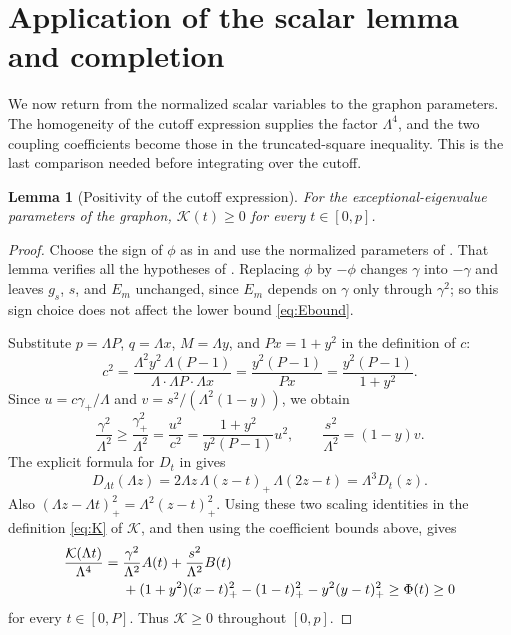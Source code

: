\documentclass[11pt]{article}
\numberwithin{equation}{section}
\newtheorem{lemma}[theorem]{Lemma}
\begin{document}
\section{Application of the scalar lemma and completion}\label{sec:completion}
We now return from the normalized scalar variables to the graphon
parameters. The homogeneity of the cutoff expression supplies the
factor $\Lambda^4$, and the two coupling coefficients become those
in the truncated-square inequality. This is the last comparison
needed before integrating over the cutoff.
\begin{lemma}[Positivity of the cutoff expression]\label{lem:cutoff-positive}
For the exceptional-eigenvalue parameters of the graphon,
$\mathcal K(t)\ge0$ for every $t\in[0,p]$.
\end{lemma}
\begin{proof}
Choose the sign of $\phi$ as in  and use
the normalized parameters of .
That lemma verifies all the hypotheses of .
Replacing $\phi$ by $-\phi$ changes $\gamma$ into $-\gamma$ and
leaves $g_s$, $s$, and $E_m$ unchanged, since $E_m$ depends on
$\gamma$ only through $\gamma^2$; so this sign choice does not
affect the lower bound \eqref{eq:Ebound}.

Substitute $p=\Lambda P$, $q=\Lambda x$, $M=\Lambda y$,
and $Px=1+y^2$ in the definition of $c$:
\[
 c^2=\frac{\Lambda^2y^2\,\Lambda(P-1)}
              {\Lambda\cdot\Lambda P\cdot\Lambda x}
     =\frac{y^2(P-1)}{Px}
     =\frac{y^2(P-1)}{1+y^2}.
\]
Since $u=c\gamma_+/\Lambda$ and
$v=s^2/(\Lambda^2(1-y))$, we obtain
\[
 \frac{\gamma^2}{\Lambda^2}\ge
 \frac{\gamma_+^2}{\Lambda^2}
 =\frac{u^2}{c^2}
 =\frac{1+y^2}{y^2(P-1)}u^2,\qquad
 \frac{s^2}{\Lambda^2}=(1-y)v.
\]
The explicit formula for $D_t$ in  gives
\[
 D_{\Lambda t}(\Lambda z)
  =2\Lambda z\,\Lambda(z-t)_+\,\Lambda(2z-t)
  =\Lambda^3D_t(z).
\]
Also $(\Lambda z-\Lambda t)_+^2=\Lambda^2(z-t)_+^2$.
Using these two scaling identities in the definition \eqref{eq:K}
of $\mathcal K$, and then using the coefficient bounds above, gives
\begin{align*}
 \frac{\mathcal K(\Lambda t)}{\Lambda^4}
 ={}&\frac{\gamma^2}{\Lambda^2}A(t)+\frac{s^2}{\Lambda^2}B(t)\notag\\
 &+(1+y^2)(x-t)_+^2-(1-t)_+^2-y^2(y-t)_+^2
 \ge\Phi(t)\ge0
\end{align*}
for every $t\in[0,P]$. Thus $\mathcal K\ge0$ throughout $[0,p]$.
\end{proof}
\end{document}
